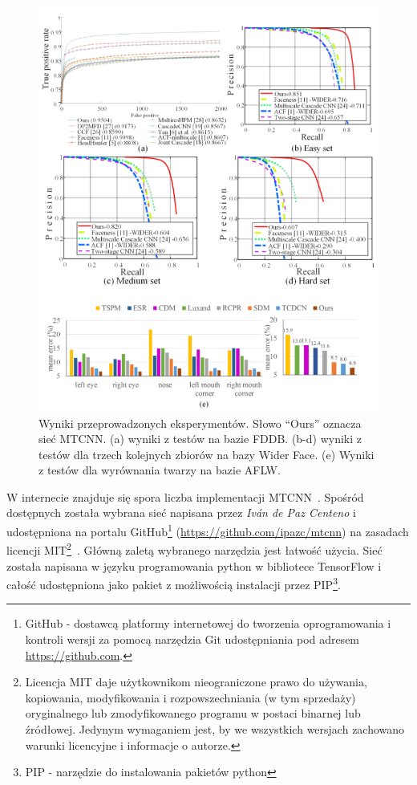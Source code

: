 \begin{figure}[P]
    \centering
    \includegraphics[width=1\textwidth]{images/mtcnn-wyniki}
    \caption{
        Wyniki przeprowadzonych eksperymentów. Słowo ``Ours'' oznacza sieć MTCNN.
        (a) wyniki z testów na bazie FDDB.
        (b-d) wyniki z testów dla trzech kolejnych zbiorów na bazy Wider Face.
        (e) Wyniki z testów dla wyrównania twarzy na bazie AFLW.
    }
    \label{fig:mtcnn_wyniki}
\end{figure}


W internecie znajduje się spora liczba implementacji MTCNN~\cite{mtznn_all_impls}.
Spośród dostępnych została wybrana sieć napisana przez \textit{Iván de Paz Centeno}
i udostępniona na portalu GitHub\footnote{GitHub - dostawcą platformy internetowej do tworzenia
oprogramowania i kontroli wersji za pomocą narzędzia Git udostępniania
pod adresem \url{https://github.com}. } (\url{https://github.com/ipazc/mtcnn}) na zasadach licencji MIT\footnote{Licencja MIT daje użytkownikom
nieograniczone prawo do używania, kopiowania, modyfikowania i rozpowszechniania (w tym sprzedaży)
    oryginalnego lub zmodyfikowanego programu w postaci binarnej lub źródłowej.
    Jedynym wymaganiem jest, by we wszystkich wersjach zachowano warunki licencyjne i informacje o autorze.
}~\cite{ipazc/mtcnn}.
Główną zaletą wybranego narzędzia jest łatwość użycia.
Sieć została napisana w języku programowania python w bibliotece TensorFlow
i całość udostępniona jako pakiet z możliwością instalacji
przez PIP\footnote{PIP - narzędzie do instalowania pakietów python}.


